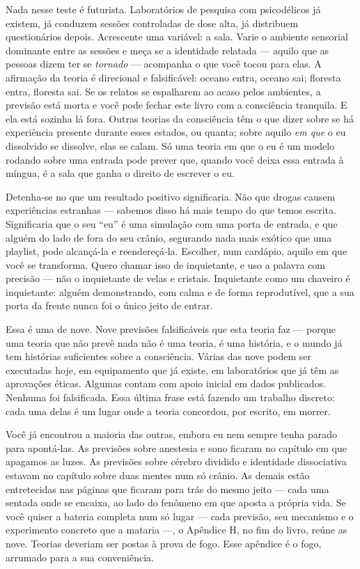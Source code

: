 \documentclass[11pt, twoside, openright]{book}
\begin{document}
Nada nesse teste é futurista. Laboratórios de pesquisa com psicodélicos já existem, já conduzem sessões controladas de dose alta, já distribuem questionários depois. Acrescente uma variável: a sala. Varie o ambiente sensorial dominante entre as sessões e meça se a identidade relatada --- aquilo que as pessoas dizem ter se \textit{tornado} --- acompanha o que você tocou para elas. A afirmação da teoria é direcional e falsificável: oceano entra, oceano sai; floresta entra, floresta sai. Se os relatos se espalharem ao acaso pelos ambientes, a previsão está morta e você pode fechar este livro com a consciência tranquila. E ela está sozinha lá fora. Outras teorias da consciência têm o que dizer sobre se há experiência presente durante esses estados, ou quanta; sobre aquilo \textit{em que} o eu dissolvido se dissolve, elas se calam. Só uma teoria em que o eu é um modelo rodando sobre uma entrada pode prever que, quando você deixa essa entrada à míngua, é a sala que ganha o direito de escrever o eu.

Detenha-se no que um resultado positivo significaria. Não que drogas causem experiências estranhas --- sabemos disso há mais tempo do que temos escrita. Significaria que o seu ``eu'' é uma simulação com uma porta de entrada, e que alguém do lado de fora do seu crânio, segurando nada mais exótico que uma playlist, pode alcançá-la e reendereçá-la. Escolher, num cardápio, aquilo em que você se transforma. Quero chamar isso de inquietante, e uso a palavra com precisão --- não o inquietante de velas e cristais. Inquietante como um chaveiro é inquietante: alguém demonstrando, com calma e de forma reprodutível, que a sua porta da frente nunca foi o único jeito de entrar.

Essa é uma de nove. Nove previsões falsificáveis que esta teoria faz --- porque uma teoria que não prevê nada não é uma teoria, é uma história, e o mundo já tem histórias suficientes sobre a consciência. Várias das nove podem ser executadas hoje, em equipamento que já existe, em laboratórios que já têm as aprovações éticas. Algumas contam com apoio inicial em dados publicados. Nenhuma foi falsificada. Essa última frase está fazendo um trabalho discreto: cada uma delas é um lugar onde a teoria concordou, por escrito, em morrer.

Você já encontrou a maioria das outras, embora eu nem sempre tenha parado para apontá-las. As previsões sobre anestesia e sono ficaram no capítulo em que apagamos as luzes. As previsões sobre cérebro dividido e identidade dissociativa estavam no capítulo sobre duas mentes num só crânio. As demais estão entretecidas nas páginas que ficaram para trás do mesmo jeito --- cada uma sentada onde se encaixa, ao lado do fenômeno em que aposta a própria vida. Se você quiser a bateria completa num só lugar --- cada previsão, seu mecanismo e o experimento concreto que a mataria ---, o Apêndice H, no fim do livro, reúne as nove. Teorias deveriam ser postas à prova de fogo. Esse apêndice é o fogo, arrumado para a sua conveniência.
\end{document}
